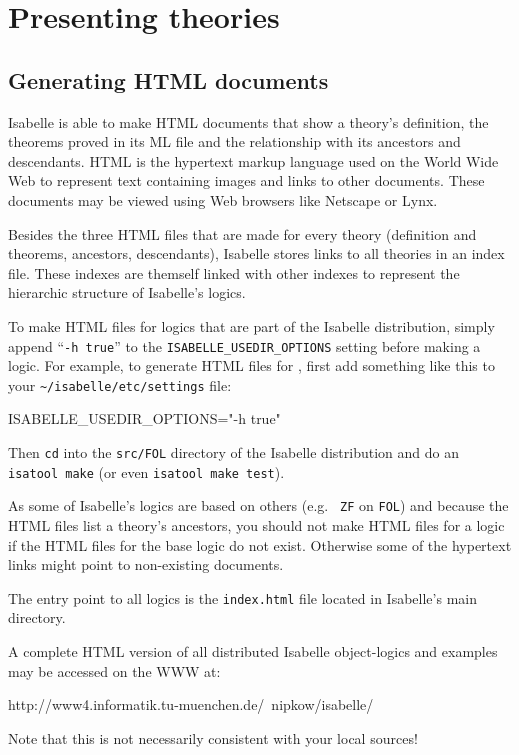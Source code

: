 
\chapter{Presenting theories}

\section{Generating HTML documents} \label{sec:html}

Isabelle is able to make HTML documents that show a theory's
definition, the theorems proved in its ML file and the relationship
with its ancestors and descendants. HTML is the hypertext markup
language used on the World Wide Web to represent text containing
images and links to other documents.  These documents may be viewed
using Web browsers like Netscape or Lynx.

Besides the three HTML files that are made for every theory
(definition and theorems, ancestors, descendants), Isabelle stores
links to all theories in an index file. These indexes are themself
linked with other indexes to represent the hierarchic structure of
Isabelle's logics.

\medskip To make HTML files for logics that are part of the Isabelle
distribution, simply append ``\texttt{-h true}'' to the
\texttt{ISABELLE_USEDIR_OPTIONS} setting before making a logic.  For
example, to generate HTML files for {\FOL}, first add something like
this to your \texttt{\~\relax/isabelle/etc/settings} file:
\begin{ttbox}
ISABELLE_USEDIR_OPTIONS="-h true"
\end{ttbox}
Then \texttt{cd} into the \texttt{src/FOL} directory of the Isabelle
distribution and do an \texttt{isatool make} (or even \texttt{isatool
  make test}).

\medskip As some of Isabelle's logics are based on others (e.g. {\tt
  ZF} on {\tt FOL}) and because the HTML files list a theory's
ancestors, you should not make HTML files for a logic if the HTML
files for the base logic do not exist. Otherwise some of the hypertext
links might point to non-existing documents.

The entry point to all logics is the {\tt index.html} file located in
Isabelle's main directory.

A complete HTML version of all distributed Isabelle object-logics and
examples may be accessed on the WWW at:
\begin{ttbox}
http://www4.informatik.tu-muenchen.de/~nipkow/isabelle/
\end{ttbox}
Note that this is not necessarily consistent with your local sources!


